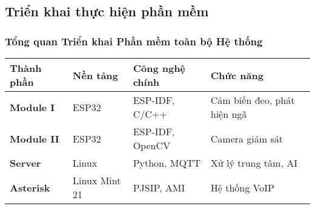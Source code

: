 \subsection{Triển khai thực hiện phần mềm}
\begin{frame}
\frametitle{Tổng quan Triển khai Phần mềm toàn bộ Hệ thống}

\begin{table}[htbp]
\centering
\small
\begin{tabular}{|l|l|l|l|}
\hline
\textbf{Thành phần} & \textbf{Nền tảng} & \textbf{Công nghệ chính} & \textbf{Chức năng} \\
\hline
\textbf{Module I} & ESP32 & ESP-IDF, C/C++ & Cảm biến đeo, phát hiện ngã \\
\hline
\textbf{Module II} & ESP32 & ESP-IDF, OpenCV & Camera giám sát \\
\hline
\textbf{Server} & Linux & Python, MQTT & Xử lý trung tâm, AI \\
\hline
\textbf{Asterisk} & Linux Mint 21 & PJSIP, AMI & Hệ thống VoIP \\
\hline
\end{tabular}
\end{table}


\end{frame}
